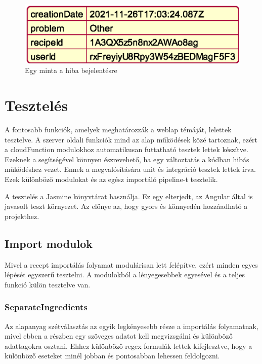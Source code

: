 \documentclass[12pt]{report}
\theoremstyle{definition}
\begin{document}
\noindent
\begin{figure}[H]
	\centering
	\includegraphics[scale=0.6]{out/diagrams/jsonReports/jsonReports.eps}
	\caption{Egy minta a hiba bejelentésre}
    \label{fig:jsonReports}
\end{figure}


\chapter{Tesztelés}
A fontosabb funkciók, amelyek meghatározzák a weblap témáját, lelettek tesztelve. A szerver oldali funkciók mind az alap működések közé tartoznak, ezért a \gls{cloudFunction} modulokhoz automatikusan futtatható tesztek lettek készítve. Ezeknek a segítségével könnyen észrevehető, ha egy változtatás a kódban hibás működéshez vezet. Ennek a megvalósítására unit és integráció tesztek lettek írva. Ezek különböző modulokat és az egész importáló pipeline-t tesztelik.

A tesztelés a Jasmine könyvtárat használja. Ez egy elterjedt, az Angular által is javasolt teszt környezet. Az előnye az, hogy gyors és könnyedén hozzáadható a projekthez. 

\section{Import modulok}
Mivel a recept importálás folyamat modulárisan lett felépítve, ezért minden egyes lépését egyszerű tesztelni. A modulokból a lényegesebbek egyesével és a teljes funkció külön tesztelve van.

\subsection{SeparateIngredients}
Az alapanyag szétválasztás az egyik legkényesebb része a importálás folyamatnak, mivel ebben a részben egy szöveges adatot kell megvizsgálni és különböző adattagokra osztani. Ehhez különböző \Gls{regex} formulák lettek kifejlesztve, hogy a különböző eseteket minél jobban és pontosabban lehessen feldolgozni.
 
\end{document}
